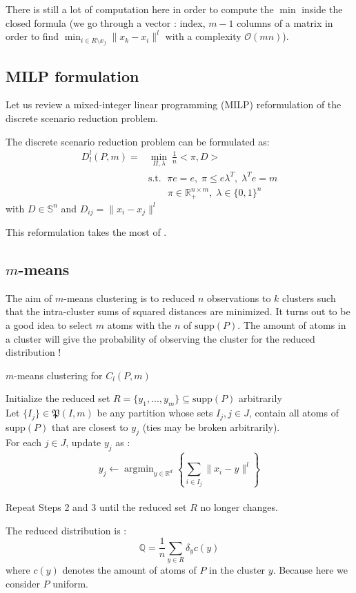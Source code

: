 \documentclass{amsart}
\newcommand{\argmin}{\mathop{\arg\min}}
\newcommand{\RR}{\mathbb{R}}
\begin{document}
There is still a lot of computation here in order to compute the $\min$ inside the closed formula (we go through a vector : index, $m-1$ columns of a matrix in order to find $\min_{i\in R\setminus x_j}\lVert x_k-x_i\rVert^l$ with a complexity $\mathcal{O}\left(mn\right)$). 

\subsection{MILP formulation}
Let us review a mixed-integer linear programming (MILP) reformulation of the discrete scenario reduction problem.
\begin{theorem}
The discrete scenario reduction problem can be formulated as: 
\begin{align*}
    D_l^l\left(P,m\right)=&\min_{\Pi,\lambda}\:\frac{1}{n}<\pi,D> \\ &\text{s.t. } \;\pi e=e, \; \pi \leq e\lambda^T,\; \lambda^Te=m\\&\quad\quad \pi\in\RR^{n\times m}_+, \; \lambda\in\{0,1\}^n
    \end{align*}
    with $D\in \mathbb{S}^n$ and $D_{ij}=\lVert x_i-x_j\rVert^l$
\end{theorem}
\begin{remark}
    This reformulation takes the most of .
\end{remark}
\subsection{$m$-means}
The aim of $m$-means clustering is to reduced $n$ observations to $k$ clusters such that the intra-cluster sums of squared distances are minimized. It turns out to be a good idea to select $m$ atoms with the $n$ of $\text{supp}\left(P\right)$. The amount of atoms in a cluster will give the probability of observing the cluster for the reduced distribution !


\begin{algorithm}
    \caption{$m$-means clustering for $C_l\left(P,m\right)$}\label{k m}
    Initialize the reduced set $R=\{y_1,...,y_m\} \subseteq \text{supp}\left(P\right)$ arbitrarily \\ Let $\{I_j\}\in\mathfrak{P}\left(I,m\right)$ be any partition whose sets $I_j, j\in J$, contain all atoms of supp$\left(P\right)$ that are closest to $y_j$ (ties may be broken arbitrarily). \\ For each $j\in J$, update $y_j$ as : $$y_j \gets \argmin_{y\in\RR^d} \left\{ \sum_{i\in I_j}\lVert x_i-y\rVert^l\right\}$$ \\ Repeat Steps 2 and 3 until the reduced set $R$ no longer changes.
\end{algorithm}
The reduced distribution is :
$$
\mathbb{Q}=\frac{1}{n}\sum_{y\in R}\delta_{y}c\left(y\right)
$$
where $ c\left(y\right)$ denotes the amount of atoms of $P$ in the cluster $y$. Because here we consider $P$ uniform.
\end{document}
